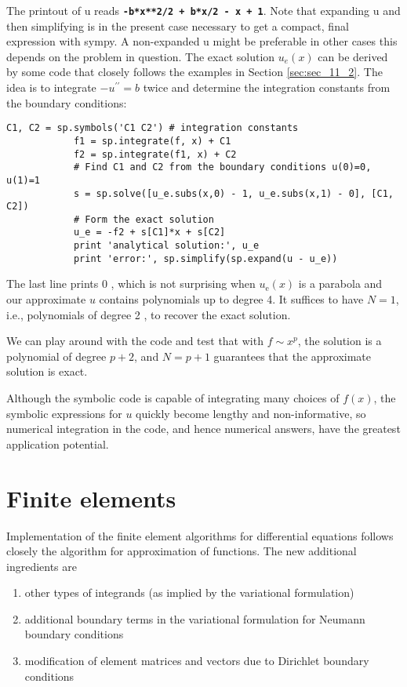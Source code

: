 \documentclass[../main.tex]{subfiles}
\begin{document}
	\noindent The printout of $\mathrm{u}$ reads \textbf{\texttt{-b*x**2/2 + b*x/2 - x + 1}}. Note that expanding $\mathrm{u}$ and then simplifying is in the present case necessary to get a compact, final expression with sympy. A non-expanded u might be preferable in other cases this depends on the problem in question.\smallbreak
	The exact solution $u_{e}(x)$ can be derived by some  code that closely follows the examples in Section \ref{sec:sec_11_2}. The idea is to integrate $-u^{\prime \prime}=b$ twice and determine the integration constants from the boundary conditions:

		\begin{lstlisting}[numbers=none]
			C1, C2 = sp.symbols('C1 C2') # integration constants
			f1 = sp.integrate(f, x) + C1
			f2 = sp.integrate(f1, x) + C2
			# Find C1 and C2 from the boundary conditions u(0)=0, u(1)=1
			s = sp.solve([u_e.subs(x,0) - 1, u_e.subs(x,1) - 0], [C1, C2])
			# Form the exact solution
			u_e = -f2 + s[C1]*x + s[C2]
			print 'analytical solution:', u_e
			print 'error:', sp.simplify(sp.expand(u - u_e))
		\end{lstlisting}
	
	
	\noindent The last line prints 0 , which is not surprising when $u_{\mathrm{e}}(x)$ is a parabola and our approximate $u$ contains polynomials up to degree 4. It suffices to have $N=1$, i.e., polynomials of degree 2 , to recover the exact solution.
	
	We can play around with the code and test that with $f \sim x^{p}$, the solution is a polynomial of degree $p+2$, and $N=p+1$ guarantees that the approximate solution is exact.
	
	Although the symbolic code is capable of integrating many choices of $f(x)$, the symbolic expressions for $u$ quickly become lengthy and non-informative, so numerical integration in the code, and hence numerical answers, have the greatest application potential.\bigbreak
	
	\section[Finite elements]{Finite elements}
		\label{sec:sec_16_3}
		 \noindent Implementation of the finite element algorithms for differential equations follows closely the algorithm for approximation of functions. The new additional ingredients are
		 \begin{enumerate}
		 	\item other types of integrands (as implied by the variational formulation)
		  	\item additional boundary terms in the variational formulation for Neumann boundary conditions
		 	\item modification of element matrices and vectors due to Dirichlet boundary conditions
		\end{enumerate}
		 
\end{document}
